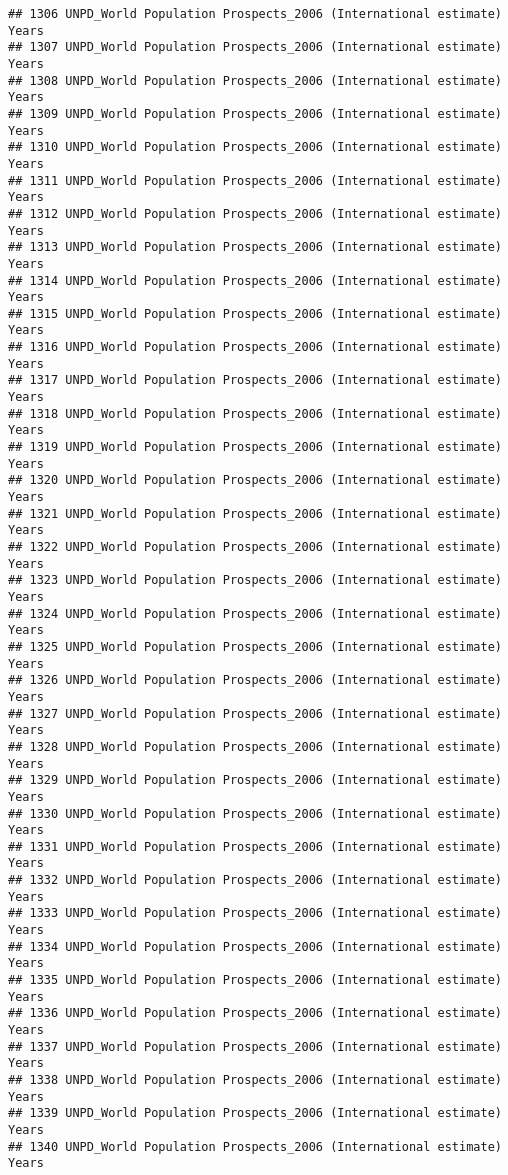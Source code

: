 \documentclass[]{article}
\begin{document}
\begin{verbatim}
## 1306 UNPD_World Population Prospects_2006 (International estimate) Years
## 1307 UNPD_World Population Prospects_2006 (International estimate) Years
## 1308 UNPD_World Population Prospects_2006 (International estimate) Years
## 1309 UNPD_World Population Prospects_2006 (International estimate) Years
## 1310 UNPD_World Population Prospects_2006 (International estimate) Years
## 1311 UNPD_World Population Prospects_2006 (International estimate) Years
## 1312 UNPD_World Population Prospects_2006 (International estimate) Years
## 1313 UNPD_World Population Prospects_2006 (International estimate) Years
## 1314 UNPD_World Population Prospects_2006 (International estimate) Years
## 1315 UNPD_World Population Prospects_2006 (International estimate) Years
## 1316 UNPD_World Population Prospects_2006 (International estimate) Years
## 1317 UNPD_World Population Prospects_2006 (International estimate) Years
## 1318 UNPD_World Population Prospects_2006 (International estimate) Years
## 1319 UNPD_World Population Prospects_2006 (International estimate) Years
## 1320 UNPD_World Population Prospects_2006 (International estimate) Years
## 1321 UNPD_World Population Prospects_2006 (International estimate) Years
## 1322 UNPD_World Population Prospects_2006 (International estimate) Years
## 1323 UNPD_World Population Prospects_2006 (International estimate) Years
## 1324 UNPD_World Population Prospects_2006 (International estimate) Years
## 1325 UNPD_World Population Prospects_2006 (International estimate) Years
## 1326 UNPD_World Population Prospects_2006 (International estimate) Years
## 1327 UNPD_World Population Prospects_2006 (International estimate) Years
## 1328 UNPD_World Population Prospects_2006 (International estimate) Years
## 1329 UNPD_World Population Prospects_2006 (International estimate) Years
## 1330 UNPD_World Population Prospects_2006 (International estimate) Years
## 1331 UNPD_World Population Prospects_2006 (International estimate) Years
## 1332 UNPD_World Population Prospects_2006 (International estimate) Years
## 1333 UNPD_World Population Prospects_2006 (International estimate) Years
## 1334 UNPD_World Population Prospects_2006 (International estimate) Years
## 1335 UNPD_World Population Prospects_2006 (International estimate) Years
## 1336 UNPD_World Population Prospects_2006 (International estimate) Years
## 1337 UNPD_World Population Prospects_2006 (International estimate) Years
## 1338 UNPD_World Population Prospects_2006 (International estimate) Years
## 1339 UNPD_World Population Prospects_2006 (International estimate) Years
## 1340 UNPD_World Population Prospects_2006 (International estimate) Years

\end{verbatim}
\end{document}
